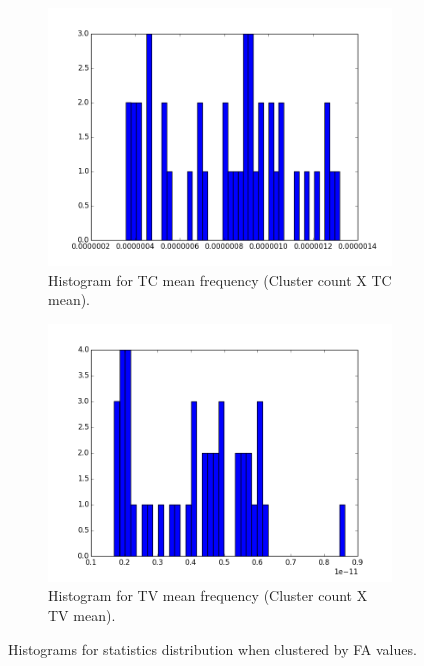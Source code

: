 \documentclass[a4paper,11pt]{report}
\begin{document}
\begin{figure}[!ht]
      \begin{subfigure}[t]{.49\textwidth}
        \includegraphics[width=1\linewidth]{img/histograms/fa_clustered_fa_mask_tc_means_hist.png}
        \caption{Histogram for TC mean frequency (Cluster count X TC mean).}
        \label{subfig:fa_hist_tc}
      \end{subfigure}\hfill%
      \begin{subfigure}[t]{.49\textwidth}
        \includegraphics[width=1\linewidth]{img/histograms/fa_clustered_fa_mask_tv_means_hist.png}
        \caption{Histogram for TV mean frequency (Cluster count X TV mean).}
        \label{subfig:fa_hist_tv}
      \end{subfigure}\hfill

      \caption{Histograms for statistics distribution when clustered by FA values.}
      \label{fig:fa-histograms}
    \end{figure}
\end{document}
